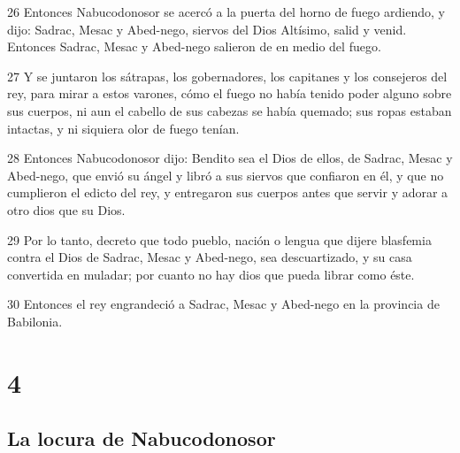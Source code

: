 \par 26 Entonces Nabucodonosor se acercó a la puerta del horno de fuego ardiendo, y dijo: Sadrac, Mesac y Abed-nego, siervos del Dios Altísimo, salid y venid. Entonces Sadrac, Mesac y Abed-nego salieron de en medio del fuego.
\par 27 Y se juntaron los sátrapas, los gobernadores, los capitanes y los consejeros del rey, para mirar a estos varones, cómo el fuego no había tenido poder alguno sobre sus cuerpos, ni aun el cabello de sus cabezas se había quemado; sus ropas estaban intactas, y ni siquiera olor de fuego tenían.
\par 28 Entonces Nabucodonosor dijo: Bendito sea el Dios de ellos, de Sadrac, Mesac y Abed-nego, que envió su ángel y libró a sus siervos que confiaron en él, y que no cumplieron el edicto del rey, y entregaron sus cuerpos antes que servir y adorar a otro dios que su Dios.
\par 29 Por lo tanto, decreto que todo pueblo, nación o lengua que dijere blasfemia contra el Dios de Sadrac, Mesac y Abed-nego, sea descuartizado, y su casa convertida en muladar; por cuanto no hay dios que pueda librar como éste.
\par 30 Entonces el rey engrandeció a Sadrac, Mesac y Abed-nego en la provincia de Babilonia.

\chapter{4}

\section*{La locura de Nabucodonosor}

